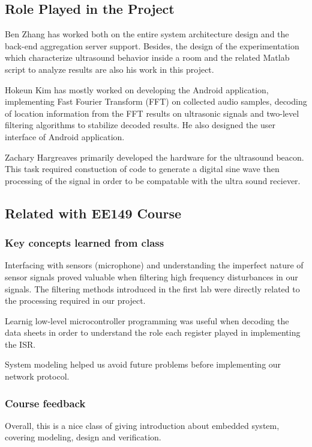 \appendix

\subsection{Role Played in the Project}
\label{sec:role-played-project}
Ben Zhang has worked both on the entire system architecture design and the back-end aggregation server support. Besides, the design of the experimentation which characterize ultrasound behavior inside a room and the related Matlab script to analyze results are also his work in this project.

Hokeun Kim has mostly worked on developing the Android application, implementing Fast Fourier Transform (FFT) on collected audio samples, decoding of location information from the FFT results on ultrasonic signals and two-level filtering algorithms to stabilize decoded results. He also designed the user interface of Android application.

Zachary Hargreaves primarily developed the hardware for the ultrasound beacon.  This task required constuction of code to generate a digital sine wave then processing of the signal in order to be compatable with the ultra sound reciever.   

\subsection{Related with EE149 Course}
\label{sec:related-with-ee149}
\subsubsection{Key concepts learned from class}
\label{sec:key-concepts-learned}

Interfacing with sensors (microphone) and understanding the imperfect nature of sensor signals proved valuable when filtering high frequency disturbances in our signals. The filtering methods introduced in the first lab were directly related to the processing required in our project. 

Learnig low-level microcontroller programming was useful when decoding the data sheets in order to understand the role each register played in implementing the ISR. 

System modeling helped us avoid future problems before implementing our network protocol.

\subsubsection{Course feedback}
\label{sec:course-feedback}
Overall, this is a nice class of giving introduction about embedded system, covering modeling, design and verification. 

